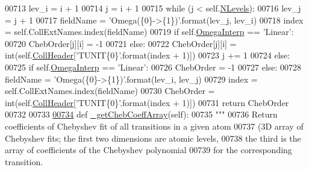 \begin{DoxyCode}
{{00713                     lev\_i = i + 1
00714                     j = i + 1
00715                     \textcolor{keywordflow}{while} (j < self.\hyperlink{classpyneb_1_1core_1_1pynebcore_1_1___coll_data_fits_a64b97a86b4dfb53e4cba3ce8ac0fdf00}{NLevels}):
00716                         lev\_j = j + 1
00717                         fieldName = \textcolor{stringliteral}{'Omega(\{0\}->\{1\})'}.format(lev\_j, lev\_i)
00718                         index = self.CollExtNames.index(fieldName)
00719                         \textcolor{keywordflow}{if} self.\hyperlink{classpyneb_1_1core_1_1pynebcore_1_1___coll_data_fits_a3e15df449393d23d1ac760671b5828cc}{OmegaInterp} == \textcolor{stringliteral}{'Linear'}:
00720                             ChebOrder[j][i] = -1
00721                         \textcolor{keywordflow}{else}:
00722                             ChebOrder[j][i] = int(self.\hyperlink{classpyneb_1_1core_1_1pynebcore_1_1___coll_data_fits_ac869d4a1a70ad7d42881b0e19a69ab4c}{CollHeader}[\textcolor{stringliteral}{'TUNIT\{0\}'}.format(index + 1)])
00723                         j += 1
00724         \textcolor{keywordflow}{else}:   
00725             \textcolor{keywordflow}{if} self.\hyperlink{classpyneb_1_1core_1_1pynebcore_1_1___coll_data_fits_a3e15df449393d23d1ac760671b5828cc}{OmegaInterp} == \textcolor{stringliteral}{'Linear'}:
00726                 ChebOrder = -1
00727             \textcolor{keywordflow}{else}:
00728                 fieldName = \textcolor{stringliteral}{'Omega(\{0\}->\{1\})'}.format(lev\_i, lev\_j)
00729                 index = self.CollExtNames.index(fieldName)
00730                 ChebOrder = int(self.\hyperlink{classpyneb_1_1core_1_1pynebcore_1_1___coll_data_fits_ac869d4a1a70ad7d42881b0e19a69ab4c}{CollHeader}[\textcolor{stringliteral}{'TUNIT\{0\}'}.format(index + 1)])
00731         \textcolor{keywordflow}{return} ChebOrder
00732 
00733 
\hypertarget{pynebcore_8py_source_l00734}{}\hyperlink{classpyneb_1_1core_1_1pynebcore_1_1___coll_data_fits_afe4a86564a0306ca1a72cfccc1a66360}{00734}     \textcolor{keyword}{def }\hyperlink{classpyneb_1_1core_1_1pynebcore_1_1___coll_data_fits_afe4a86564a0306ca1a72cfccc1a66360}{\_getChebCoeffArray}(self):
00735         \textcolor{stringliteral}{"""}
00736 \textcolor{stringliteral}{        Return coefficients of Chebyshev fit of all transitions in a given atom}
00737 \textcolor{stringliteral}{            (3D array of Chebyshev fits; the first two dimensions are atomic levels,}
00738 \textcolor{stringliteral}{            the third is the array of coefficients of the Chebyshev polynomial}
00739 \textcolor{stringliteral}{            for the corresponding transition.}
}}
\end{DoxyCode}

